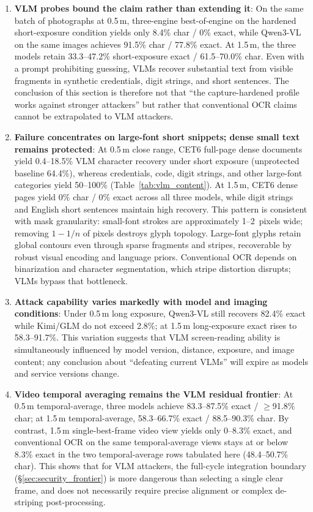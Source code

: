 \documentclass{ieeeaccess}
\begin{document}
\begin{enumerate}
\item \textbf{VLM probes bound the claim rather than extending it}: On the same batch of photographs at 0.5\,m, three-engine best-of-engine on the hardened short-exposure condition yields only 8.4\% char / 0\% exact, while Qwen3-VL on the same images achieves 91.5\% char / 77.8\% exact. At 1.5\,m, the three models retain 33.3--47.2\% short-exposure exact / 61.5--70.0\% char. Even with a prompt prohibiting guessing, VLMs recover substantial text from visible fragments in synthetic credentials, digit strings, and short sentences. The conclusion of this section is therefore not that ``the capture-hardened profile works against stronger attackers'' but rather that conventional OCR claims cannot be extrapolated to VLM attackers.

\item \textbf{Failure concentrates on large-font short snippets; dense small text remains protected}: At 0.5\,m close range, CET6 full-page dense documents yield 0.4--18.5\% VLM character recovery under short exposure (unprotected baseline 64.4\%), whereas credentials, code, digit strings, and other large-font categories yield 50--100\% (Table~\ref{tab:vlm_content}). At 1.5\,m, CET6 dense pages yield 0\% char / 0\% exact across all three models, while digit strings and English short sentences maintain high recovery. This pattern is consistent with mask granularity: small-font strokes are approximately 1--2~pixels wide; removing $1-1/n$ of pixels destroys glyph topology. Large-font glyphs retain global contours even through sparse fragments and stripes, recoverable by robust visual encoding and language priors. Conventional OCR depends on binarization and character segmentation, which stripe distortion disrupts; VLMs bypass that bottleneck.

\item \textbf{Attack capability varies markedly with model and imaging conditions}: Under 0.5\,m long exposure, Qwen3-VL still recovers 82.4\% exact while Kimi/GLM do not exceed 2.8\%; at 1.5\,m long-exposure exact rises to 58.3--91.7\%. This variation suggests that VLM screen-reading ability is simultaneously influenced by model version, distance, exposure, and image content; any conclusion about ``defeating current VLMs'' will expire as models and service versions change.

\item \textbf{Video temporal averaging remains the VLM residual frontier}: At 0.5\,m temporal-average, three models achieve 83.3--87.5\% exact / $\geq$91.8\% char; at 1.5\,m temporal-average, 58.3--66.7\% exact / 88.5--90.3\% char. By contrast, 1.5\,m single-best-frame video view yields only 0--8.3\% exact, and conventional OCR on the same temporal-average views stays at or below 8.3\% exact in the two temporal-average rows tabulated here (48.4--50.7\% char). This shows that for VLM attackers, the full-cycle integration boundary (\S\ref{sec:security_frontier}) is more dangerous than selecting a single clear frame, and does not necessarily require precise alignment or complex de-striping post-processing.
\end{enumerate}
\end{document}
